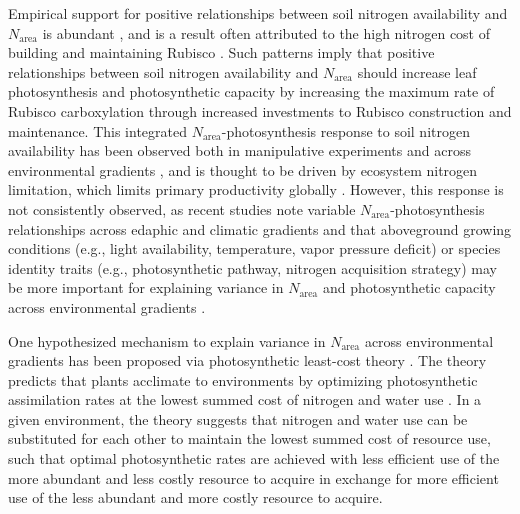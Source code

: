 Empirical support for positive relationships between soil nitrogen availability and $N_\mathrm{area}$ is abundant , and is a result often attributed to the high nitrogen cost of building and maintaining Rubisco . Such patterns imply that positive relationships between soil nitrogen availability and $N_\mathrm{area}$ should increase leaf photosynthesis and photosynthetic capacity by increasing the maximum rate of Rubisco carboxylation through increased investments to Rubisco construction and maintenance. This integrated $N_\mathrm{area}$-photosynthesis response to soil nitrogen availability has been observed both in manipulative experiments and across environmental gradients , and is thought to be driven by ecosystem nitrogen limitation, which limits primary productivity globally . However, this response is not consistently observed, as recent studies note variable $N_\mathrm{area}$-photosynthesis relationships across edaphic and climatic gradients  and that aboveground growing conditions (e.g., light availability, temperature, vapor pressure deficit) or species identity traits (e.g., photosynthetic pathway, nitrogen acquisition strategy) may be more important for explaining variance in $N_\mathrm{area}$ and photosynthetic capacity across environmental gradients .

One hypothesized mechanism to explain variance in $N_\mathrm{area}$ across environmental gradients has been proposed via photosynthetic least-cost theory . The theory predicts that plants acclimate to environments by optimizing photosynthetic assimilation rates at the lowest summed cost of nitrogen and water use . In a given environment, the theory suggests that nitrogen and water use can be substituted for each other to maintain the lowest summed cost of resource use, such that optimal photosynthetic rates are achieved with less efficient use of the more abundant and less costly resource to acquire in exchange for more efficient use of the less abundant and more costly resource to acquire.

